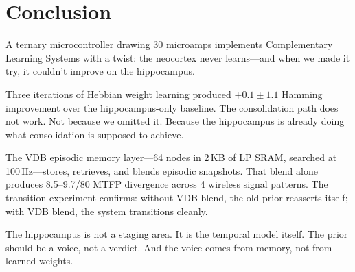\documentclass[11pt,letterpaper]{article}
\begin{document}
\section{Conclusion}

A ternary microcontroller drawing 30 microamps implements Complementary Learning Systems with a twist: the neocortex never learns---and when we made it try, it couldn't improve on the hippocampus.

Three iterations of Hebbian weight learning produced $+0.1 \pm 1.1$ Hamming improvement over the hippocampus-only baseline. The consolidation path does not work. Not because we omitted it. Because the hippocampus is already doing what consolidation is supposed to achieve.

The VDB episodic memory layer---64 nodes in 2\,KB of LP SRAM, searched at 100\,Hz---stores, retrieves, and blends episodic snapshots. That blend alone produces 8.5--9.7/80 MTFP divergence across 4 wireless signal patterns. The transition experiment confirms: without VDB blend, the old prior reasserts itself; with VDB blend, the system transitions cleanly.

The hippocampus is not a staging area. It is the temporal model itself. The prior should be a voice, not a verdict. And the voice comes from memory, not from learned weights.
\end{document}
